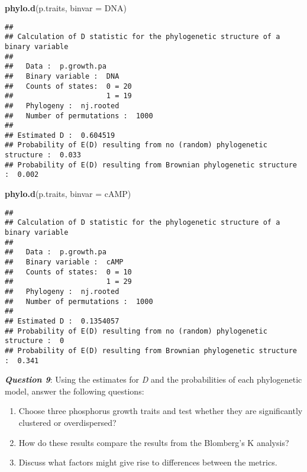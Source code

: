 \documentclass[]{article}
\newenvironment{Shaded}{\begin{snugshade}}{\end{snugshade}}
\newcommand{\KeywordTok}[1]{\textcolor[rgb]{0.13,0.29,0.53}{\textbf{#1}}}
\newcommand{\DataTypeTok}[1]{\textcolor[rgb]{0.13,0.29,0.53}{#1}}
\newcommand{\NormalTok}[1]{#1}
\providecommand{\tightlist}{%
  \setlength{\itemsep}{0pt}\setlength{\parskip}{0pt}}
\begin{document}
\begin{Shaded}
\begin{Highlighting}[]
\KeywordTok{phylo.d}\NormalTok{(p.traits, }\DataTypeTok{binvar =}\NormalTok{ DNA)}
\end{Highlighting}
\end{Shaded}

\begin{verbatim}
## 
## Calculation of D statistic for the phylogenetic structure of a binary variable
## 
##   Data :  p.growth.pa
##   Binary variable :  DNA
##   Counts of states:  0 = 20
##                      1 = 19
##   Phylogeny :  nj.rooted
##   Number of permutations :  1000
## 
## Estimated D :  0.604519
## Probability of E(D) resulting from no (random) phylogenetic structure :  0.033
## Probability of E(D) resulting from Brownian phylogenetic structure    :  0.002
\end{verbatim}

\begin{Shaded}
\begin{Highlighting}[]
\KeywordTok{phylo.d}\NormalTok{(p.traits, }\DataTypeTok{binvar =}\NormalTok{ cAMP)}
\end{Highlighting}
\end{Shaded}

\begin{verbatim}
## 
## Calculation of D statistic for the phylogenetic structure of a binary variable
## 
##   Data :  p.growth.pa
##   Binary variable :  cAMP
##   Counts of states:  0 = 10
##                      1 = 29
##   Phylogeny :  nj.rooted
##   Number of permutations :  1000
## 
## Estimated D :  0.1354057
## Probability of E(D) resulting from no (random) phylogenetic structure :  0
## Probability of E(D) resulting from Brownian phylogenetic structure    :  0.341
\end{verbatim}

\textbf{\emph{Question 9}}: Using the estimates for \emph{D} and the
probabilities of each phylogenetic model, answer the following
questions:

\begin{enumerate}
\def\labelenumi{\alph{enumi}.}
\tightlist
\item
  Choose three phosphorus growth traits and test whether they are
  significantly clustered or overdispersed?\\
\item
  How do these results compare the results from the Blomberg's K
  analysis?\\
\item
  Discuss what factors might give rise to differences between the
  metrics.
\end{enumerate}
\end{document}
